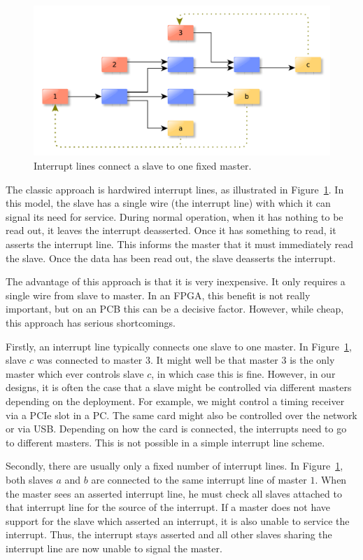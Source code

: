 \documentclass[a4paper]{jacow}
\begin{document}
\begin{figure}[t]
  \centering
 \includegraphics*[width=\columnwidth]{bad-irq}
  \caption{Interrupt lines connect a slave to one fixed master.}
  \label{fig:bad-irq}
\end{figure}

The classic approach is hardwired interrupt lines,
as illustrated in Figure~\ref{fig:bad-irq}.
In this model, the slave has a single wire (the interrupt line) with which
it can signal its need for service.
During normal operation, when it has nothing to be read out,
it leaves the interrupt deasserted.
Once it has something to read, it asserts the interrupt line.
This informs the master that it must immediately read the slave.
Once the data has been read out, the slave deasserts the interrupt.

The advantage of this approach is that it is very inexpensive.
It only requires a single wire from slave to master.
In an FPGA, this benefit is not really important, 
but on an PCB this can be a decisive factor.
However, while cheap, this approach has serious shortcomings.

Firstly, an interrupt line typically connects one slave to one master.
In Figure~\ref{fig:bad-irq}, slave $c$ was connected to master $3$.
It might well be that master $3$ is the only master which ever controls
slave $c$, in which case this is fine.
However, in our designs, it is often the case that a slave might be
controlled via different masters depending on the deployment.
For example, we might control a timing receiver via a PCIe slot in a PC.
The same card might also be controlled over the network or via USB.
Depending on how the card is connected, the interrupts need to go to
different masters.
This is not possible in a simple interrupt line scheme.

Secondly, there are usually only a fixed number of interrupt lines.
In Figure~\ref{fig:bad-irq}, both slaves $a$ and $b$ are connected to the
same interrupt line of master $1$.
When the master sees an asserted interrupt line, he must check all slaves
attached to that interrupt line for the source of the interrupt.
If a master does not have support for the slave which asserted an
interrupt, it is also unable to service the interrupt.
Thus, the interrupt stays asserted and all other slaves sharing the
interrupt line are now unable to signal the master.
\end{document}
